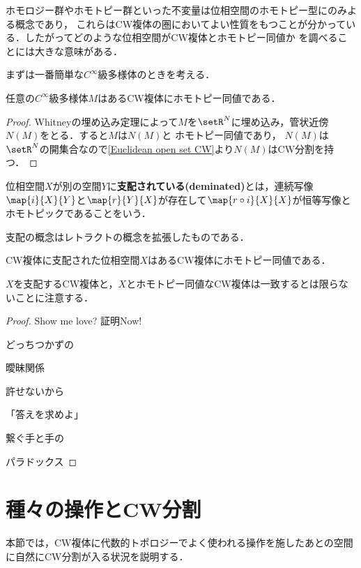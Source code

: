 \documentclass[uplatex]{jsarticle}
\newcommand{\smooth}{$C^{\infty}$級}
\begin{document}
ホモロジー群やホモトピー群といった不変量は位相空間のホモトピー型にのみよる概念であり，
これらはCW複体の圏においてよい性質をもつことが分かっている．したがってどのような位相空間がCW複体とホモトピー同値か
を調べることには大きな意味がある．

まずは一番簡単な\smooth 多様体のときを考える．

\begin{corollary}
  任意の\smooth 多様体$M$はあるCW複体にホモトピー同値である．
\end{corollary}

\begin{proof}
  Whitneyの埋め込み定理によって$M$を$\setR^N$に埋め込み，管状近傍$N(M)$をとる．すると$M$は$N(M)$と
  ホモトピー同値であり，
  $N(M)$は$\setR^N$の開集合なので\cref{Euclidean open set CW}より$N(M)$はCW分割を持つ．
\end{proof}

\begin{definition}
  位相空間$X$が別の空間$Y$に\textbf{支配されている(deminated)}とは，連続写像$\map{i}{X}{Y}$と$\map{r}{Y}{X}$が存在して$\map{r\circ i}{X}{X}$が恒等写像とホモトピックであることをいう．
\end{definition}

支配の概念はレトラクトの概念を拡張したものである．

\begin{theorem}\label{CW dominated}
  CW複体に支配された位相空間$X$はあるCW複体にホモトピー同値である．
\end{theorem}

$X$を支配するCW複体と，$X$とホモトピー同値なCW複体は一致するとは限らないことに注意する．

\begin{proof}
  Show me love? 証明Now!

  どっちつかずの

  曖昧\quad 関係

  許せないから

  「答えを求めよ」

  繋ぐ手と手の

  パラドックス
\end{proof}

\section{種々の操作とCW分割}

本節では，CW複体に代数的トポロジーでよく使われる操作を施したあとの空間に自然にCW分割が入る状況を説明する．
\end{document}
